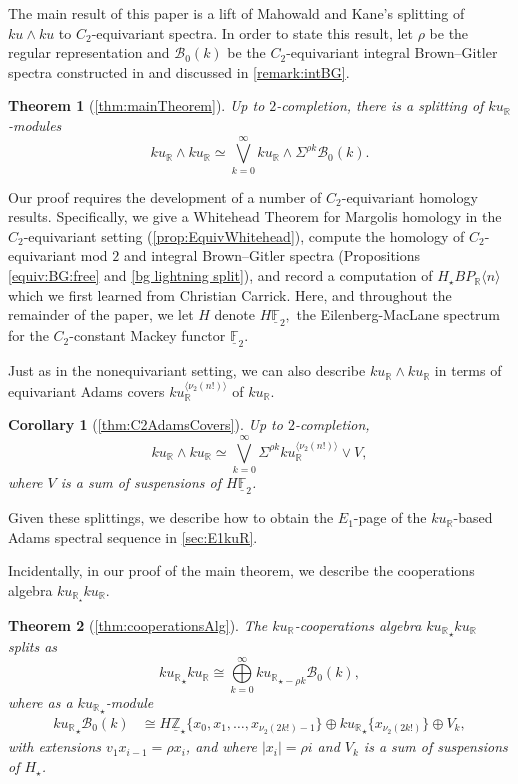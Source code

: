 \documentclass{amsart}
\newtheorem*{thm*}{Theorem}
\newtheorem*{cor*}{Corollary}
\theoremstyle{plain}
\numberwithin{equation}{section}
\numberwithin{figure}{section}
\newcommand{\mF}{{\mathbb F}}
\newcommand{\mR}{{\mathbb R}}
\newcommand{\mZ}{{\mathbb Z}}
\newcommand{\cB}{{\mathcal B}}
\newcommand{\umF}{\underline{\mF}}
\newcommand{\umZ}{\underline{\mZ}}
\newcommand{\0}{\langle 0 \rangle }
\begin{document}
The main result of this paper is a lift of Mahowald and Kane's splitting of $ku \wedge ku$ to $C_{2}$-equivariant spectra. In order to state this result, let $\rho$ be the regular representation and $\cB_{0}(k)$ be the $C_2$-equivariant integral Brown–Gitler spectra constructed in \cite{LiPetersenTatum23} and discussed in \cref{remark:intBG}.

\begin{thm*}[\cref{thm:mainTheorem}] 
Up to $2$-completion, there is a splitting of $ku_\mR$-modules
    \[ku_\mR \wedge ku_\mR  \simeq \overset{\infty}{\underset{k=0}{\bigvee}} ku_\mR \wedge \Sigma^{\rho k}\cB_{0}(k).\]
\end{thm*} 

Our proof requires the development of a number of $C_2$-equivariant homology results. Specifically, we give a Whitehead Theorem for Margolis homology in the $C_2$-equivariant setting (\cref{prop:EquivWhitehead}), compute the homology of $C_2$-equivariant mod $2$ and integral Brown--Gitler spectra (Propositions \ref{equiv:BG:free} and \ref{bg lightning split}), and record a computation of $H_\star BP_\mR \langle n \rangle$ which we first learned from Christian Carrick. Here, and throughout the remainder of the paper, we let $H$ denote $H\umF_{2},$ the Eilenberg-MacLane spectrum for the $C_2$-constant Mackey functor $\umF_2.$ 

Just as in the nonequivariant setting, we can also describe $ku_\mR \wedge ku_\mR$ in terms of equivariant Adams covers  $ku_{\mR}^{\langle \nu_{2}(n!) \rangle}$ of $ku_{\mR}$. 

\begin{cor*}[\cref{thm:C2AdamsCovers}]
Up to $2$-completion,    \[ ku_{\mR} \wedge ku_{\mR} \simeq \bigvee\limits_{k=0}^{\infty} \Sigma^{\rho k} ku_{\mR}^{\langle \nu_{2}(n!) \rangle} \vee V,\]
where $V$ is a sum of suspensions of $H\umF_{2}$.
\end{cor*}
Given these splittings, we describe how to obtain the $E_1$-page of the $ku_\mR$-based Adams spectral sequence in \cref{sec:E1kuR}.

Incidentally, in our proof of the main theorem, we describe the cooperations algebra $ku_{{\mR}_\star}ku_\mR$. 
\begin{thm*}[\cref{thm:cooperationsAlg}]
The $ku_\mR$-cooperations algebra ${ku_\mR}_\star ku_\mR$ splits as
    \[
    {ku_\mR}_\star ku_\mR \cong \overset{\infty}{\underset{k=0}{\bigoplus}}  {ku_\mR}_{\star - \rho k} \cB_0(k), 
    \]
    where as a ${ku_\mR}_\star$-module 
    \begin{align*}
        {ku_\mR}_{\star}\cB_{0}(k) 
        & \cong  H \umZ_{\star}\{x_{0}, x_{1}, \ldots, x_{\nu_2(2k!)-1} \} \oplus {ku_\mathbb{R}}_{\star}\{x_{\nu_2(2k!)} \} \oplus V_{k},
    \end{align*}
    with extensions $v_1 x_{i - 1} = \rho x_i$, and where $| x_i | = \rho i$ and $V_k$ is a sum of suspensions of $H_\star$.
\end{thm*}
\end{document}
